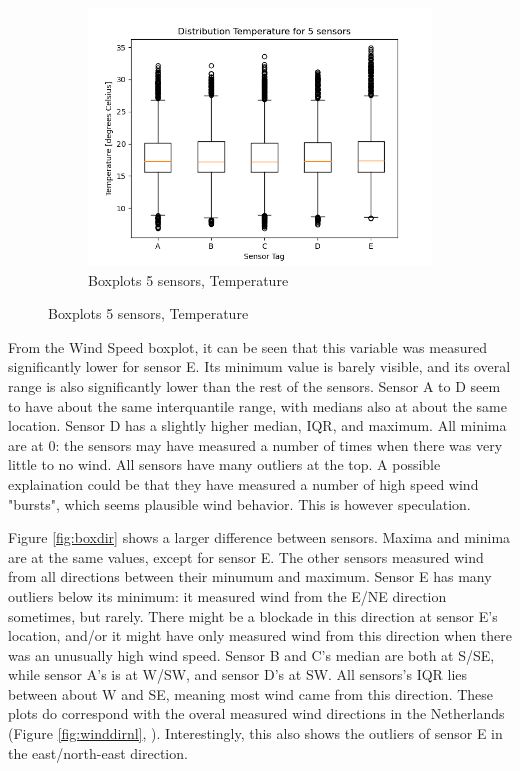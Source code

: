 \documentclass{report}
\begin{document}
\begin{figure}[H]
		\begin{subfigure}[b]{0.7\linewidth}
			\includegraphics[width=\linewidth]{GEO1001_hw01_images/GEO1001_hw01_A1_box_temp.png}
			\caption{Boxplots 5 sensors, Temperature}
			\label{fig:boxtemp}
		\end{subfigure}
	\end{figure}

	From the Wind Speed boxplot, it can be seen that this variable was measured significantly lower for sensor E. Its minimum value is barely visible, and its overal range is also significantly lower than the rest of the sensors. Sensor A to D seem to have about the same interquantile range, with medians also at about the same location. Sensor D has a slightly higher median, IQR, and maximum. All minima are at 0: the sensors may have measured a number of times when there was very little to no wind. All sensors have many outliers at the top. A possible explaination could be that they have measured a number of high speed wind "bursts", which seems plausible wind behavior. This is however speculation.
	
	Figure \ref{fig:boxdir} shows a larger difference between sensors. Maxima and minima are at the same values, except for sensor E. The other sensors measured wind from all directions between their minumum and maximum. Sensor E has many outliers below its minimum: it measured wind from the E/NE direction sometimes, but rarely. There might be a blockade in this direction at sensor E's location, and/or it might have only measured wind from this direction when there was an unusually high wind speed. Sensor B and C's median are both at S/SE, while sensor A's is at W/SW, and sensor D's at SW. All sensors's IQR lies between about W and SE, meaning most wind came from this direction. These plots do correspond with the overal measured wind directions in the Netherlands (Figure \ref{fig:winddirnl}, \cite{journalpone}). Interestingly, this also shows the outliers of sensor E in the east/north-east direction.
	
\end{document}
